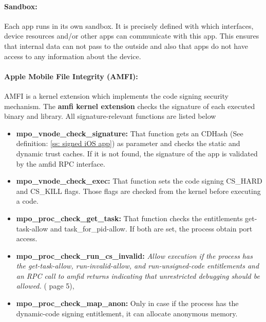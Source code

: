 \paragraph{Sandbox:} Each app runs in its own sandbox. It is precisely defined with which interfaces, device resources and/or other apps can communicate with this app. This ensures that internal data can not pass to the outside and also that apps do not have access to any information about the device. \cite{Apple[6], Sandbox[1], Sandbox[2],Sandbox[3], Sandbox[4], Sandbox[5]}

\paragraph{Apple Mobile File Integrity (AMFI):} 
\label{para: amfi}
AMFI is a kernel extension which implements the code signing security mechanism. The \textbf{amfi kernel extension} checks the signature of each executed binary and library. All signature-relevant functions are listed below 
\begin{itemize}
    \item \label{item:AMFIfunc} \textbf{mpo\_vnode\_check\_signature:} 
    That function gets an CDHash (See definition: \ref{ss: signed iOS app}) as parameter and checks the static and dynamic trust caches.
    If it is not found, the signature of the app is validated by the amfid RPC interface. \cite{iOSSec[5], Hacking[1]} 
    
    \item \textbf{mpo\_vnode\_check\_exec:}
    That function sets the code signing CS\_HARD and CS\_KILL flags. Those flags are checked from the kernel before executing a code. \cite{iOSSec[5],  Hacking[1]}
    \item \textbf{mpo\_proc\_check\_get\_task:}
    That function checks the entitlements get-task-allow and task\_for\_pid-allow. If both are set, the process obtain port access.  \cite{iOSSec[5],  Hacking[1]}
    
    \item \textbf{mpo\_proc\_check\_run\_cs\_invalid:}
    \glqq \textit{Allow execution if the process has the get-task-allow, run-invalid-allow, and run-unsigned-code entitlements and an RPC call to amfid returns indicating that unrestricted debugging should be allowed.}\grqq{} (\cite{iOSSec[5]} page 5), \cite{Hacking[1]}
    
    \item \textbf{mpo\_proc\_check\_map\_anon:}
    Only in case if the process has the dynamic-code signing entitlement, it can allocate anonymous memory.

\end{itemize}

